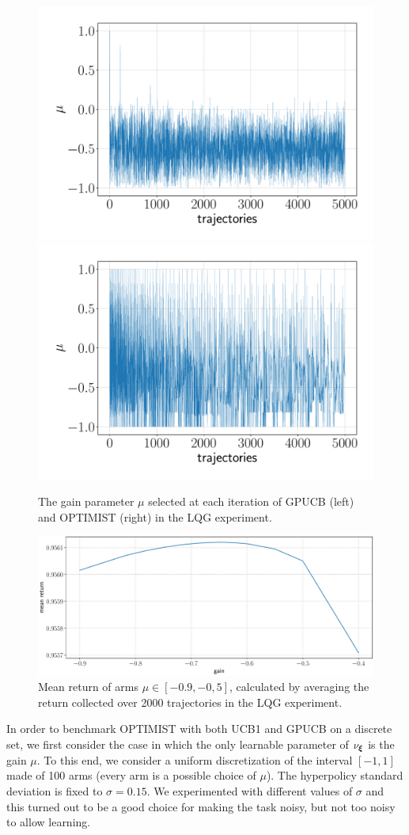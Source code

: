 \begin{figure}[t!] 
\includegraphics[width=.5\textwidth]{Images/LQG_GPUCB_mu.pdf}\hfill
\includegraphics[width=.5\textwidth]{Images/LQG_OPTIMIST_mu.pdf}\hfill
\caption{The gain parameter $\mu$ selected at each iteration of \gls{GPUCB} (left) and \gls{OPTIMIST} (right) in the \gls{LQG} experiment.}
\label{fig:LQGmu}
\end{figure}


\begin{figure}[t!]
\centering
\includegraphics[width=.75\textwidth,keepaspectratio]{Images/LQG_optimal_gain.pdf}
\caption{Mean return of arms $\mu\in[-0.9,-0,5]$, calculated by averaging the return collected over 2000 trajectories in the \gls{LQG} experiment.}
\label{fig:LQGoptimalgain}
\end{figure}

In order to benchmark \gls{OPTIMIST} with both \gls{UCB}1 and \gls{GPUCB} on a discrete set, we first consider the case in which the only learnable parameter of $\nu_{\boldsymbol{\xi}}$ is the gain $\mu$. To this end, we consider a uniform discretization of the interval $[-1,1]$ made of 100 arms (every arm is a possible choice of $\mu$). The hyperpolicy standard deviation is fixed to $\sigma=0.15$. We experimented with different values of $\sigma$ and this turned out to be a good choice for making the task noisy, but not too noisy to allow learning.


